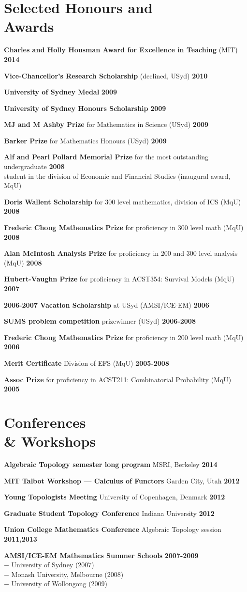 \documentclass[margin,line]{resume}
\newcommand{\award}[3]{\textbf{#1} #2 \hfill \textbf{#3}
           
\vspace{-2.3mm}}
\newcommand{\twolineaward}[4]{\textbf{#1} #2 \hfill \textbf{#4}\\%
#3
           
\vspace{-2.3mm}}
\begin{document}
\begin{resume}
\vspace{2mm}

    \section{\mysidestyle Selected Honours and\\Awards} 

\award{Charles and Holly Housman Award for Excellence in Teaching}{(MIT)}{2014}
\award{Vice-Chancellor's Research Scholarship}{(declined, USyd)}{2010}
\award{University of Sydney Medal}{}{2009}
\award{University of Sydney Honours Scholarship}{}{2009}
\award{MJ and M Ashby Prize}{for Mathematics in Science (USyd)}{2009}
\award{Barker Prize}{for Mathematics Honours (USyd)}{2009}
\twolineaward{Alf and Pearl Pollard Memorial Prize}{for the most outstanding undergraduate}{student in the division of Economic and Financial Studies (inaugural award, MqU)}{2008}
\award{Doris Wallent Scholarship}{for 300 level mathematics, division of ICS (MqU)}{2008}
\award{Frederic Chong Mathematics Prize}{for proficiency in 300 level math (MqU)}{2008}
\award{Alan McIntosh Analysis Prize}{for proficiency in 200 and 300 level analysis (MqU)}{2008}
\award{Hubert-Vaughn Prize}{for proficiency in ACST354: Survival Models (MqU)}{2007}
\award{2006-2007 Vacation Scholarship}{at USyd (AMSI/ICE-EM)}{2006}
\award{SUMS problem competition}{prizewinner (USyd)}{2006-2008}
\award{Frederic Chong Mathematics Prize}{for proficiency in 200 level math (MqU)}{2006}
\award{Merit Certificate}{Division of EFS (MqU)}{2005-2008}
\award{Assoc Prize}{for proficiency in ACST211: Combinatorial Probability (MqU)}{2005}

    \section{\mysidestyle Conferences \\ \& Workshops}

\award{Algebraic Topology semester long program}{MSRI, Berkeley}{2014}
\award{MIT Talbot Workshop --- Calculus of Functors}{Garden City, Utah}{2012}
\award{Young Topologists Meeting}{University of Copenhagen, Denmark}{2012}
\award{Graduate Student Topology Conference}{Indiana University}{2012}
\award{Union College Mathematics Conference}{Algebraic Topology session}{2011,2013}
\twolineaward{AMSI/ICE-EM Mathematics Summer Schools}{}{%
\phantom{space}$-$ University of Sydney (2007)\\
\phantom{space}$-$ Monash University, Melbourne (2008)\\
\phantom{space}$-$ University of Wollongong (2009)%
}{2007-2009}


\end{resume}
\end{document}
